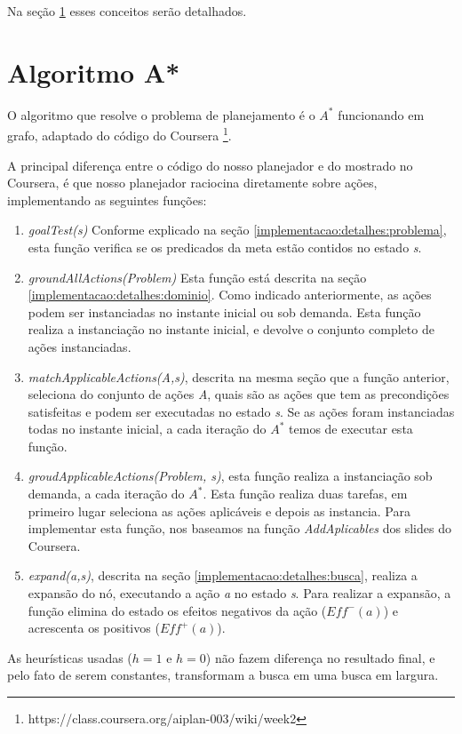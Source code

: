\documentclass[12pt,a4paper]{article}
\begin{document}
Na seção \ref{astar} esses conceitos serão detalhados.

\section{Algoritmo A*}\label{astar}
O algoritmo que resolve o problema de planejamento é o $A^*$ funcionando em grafo, adaptado do código do Coursera \footnote{https://class.coursera.org/aiplan-003/wiki/week2}.

A principal diferença entre o código do nosso planejador e do mostrado no Coursera, é que nosso planejador raciocina diretamente sobre ações, implementando as seguintes funções:

\begin{enumerate}
\item \textit{goalTest(s)} Conforme explicado na seção \ref{implementacao:detalhes:problema}, esta função verifica se os predicados da meta estão contidos no estado \textit{s}.
\item \textit{groundAllActions(Problem)} Esta função está descrita na seção \ref{implementacao:detalhes:dominio}. Como indicado anteriormente, as ações podem ser instanciadas no instante inicial ou sob demanda. Esta função realiza a instanciação no instante inicial, e devolve o conjunto completo de ações instanciadas.
\item \textit{matchApplicableActions(A,s)}, descrita na mesma seção que a função anterior, seleciona do conjunto de ações \textit{A}, quais são as ações que tem as precondições satisfeitas e podem ser executadas no estado \textit{s}. Se as ações foram instanciadas todas no instante inicial, a cada iteração do $A^*$ temos de executar esta função.
\item \textit{groudApplicableActions(Problem, s)}, esta função realiza a instanciação sob demanda, a cada iteração do $A^*$. Esta função realiza duas tarefas, em primeiro lugar seleciona as ações aplicáveis e depois as instancia. Para implementar esta função, nos baseamos na função \textit{AddAplicables} dos slides do Coursera.
\item \textit{expand(a,s)}, descrita na seção \ref{implementacao:detalhes:busca}, realiza a expansão do nó, executando a ação \textit{a} no estado \textit{s}. Para realizar a expansão, a função elimina do estado os efeitos negativos da ação ($Eff^-(a)$) e acrescenta os positivos ($Eff^+(a)$).
\end{enumerate}

As heurísticas usadas ($h=1$ e $h=0$) não fazem diferença no resultado final, e pelo fato de serem constantes, transformam a busca em uma busca em largura.
\end{document}
